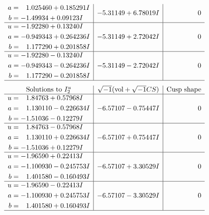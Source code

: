 \documentclass[1p]{elsarticle_modified}
\theoremstyle{definition}
\newcommand{\I}{\sqrt{-1}}
\begin{document}
$$\begin{array}{c|c|c}
\begin{aligned}
a &= \phantom{-}1.025460 + 0.185291 I \\
b &= -1.49934 + 0.09123 I\end{aligned}
 & -5.31149 + 6.78019 I & \phantom{-0.000000 } 0 \\ \hline\begin{aligned}
u &= -1.92280 + 0.13240 I \\
a &= -0.949343 + 0.264236 I \\
b &= \phantom{-}1.177290 + 0.201858 I\end{aligned}
 & -5.31149 + 2.72042 I & \phantom{-0.000000 } 0 \\ \hline\begin{aligned}
u &= -1.92280 - 0.13240 I \\
a &= -0.949343 - 0.264236 I \\
b &= \phantom{-}1.177290 - 0.201858 I\end{aligned}
 & -5.31149 - 2.72042 I & \phantom{-0.000000 } 0\\
 \hline 
 \end{array}$$\newpage$$\begin{array}{c|c|c}  
\text{Solutions to }I^u_{2}& \I (\text{vol} + \sqrt{-1}CS) & \text{Cusp shape}\\
 \hline 
\begin{aligned}
u &= \phantom{-}1.84763 + 0.57968 I \\
a &= \phantom{-}1.130110 - 0.226634 I \\
b &= -1.51036 - 0.12279 I\end{aligned}
 & -6.57107 - 0.75447 I & \phantom{-0.000000 } 0 \\ \hline\begin{aligned}
u &= \phantom{-}1.84763 - 0.57968 I \\
a &= \phantom{-}1.130110 + 0.226634 I \\
b &= -1.51036 + 0.12279 I\end{aligned}
 & -6.57107 + 0.75447 I & \phantom{-0.000000 } 0 \\ \hline\begin{aligned}
u &= -1.96590 + 0.22413 I \\
a &= -1.100930 - 0.245753 I \\
b &= \phantom{-}1.401580 - 0.160493 I\end{aligned}
 & -6.57107 + 3.30529 I & \phantom{-0.000000 } 0 \\ \hline\begin{aligned}
u &= -1.96590 - 0.22413 I \\
a &= -1.100930 + 0.245753 I \\
b &= \phantom{-}1.401580 + 0.160493 I\end{aligned}
 & -6.57107 - 3.30529 I & \phantom{-0.000000 } 0\\
 \hline 
 \end{array}$$\newpage\newpage\renewcommand{\arraystretch}{1}
\end{document}
